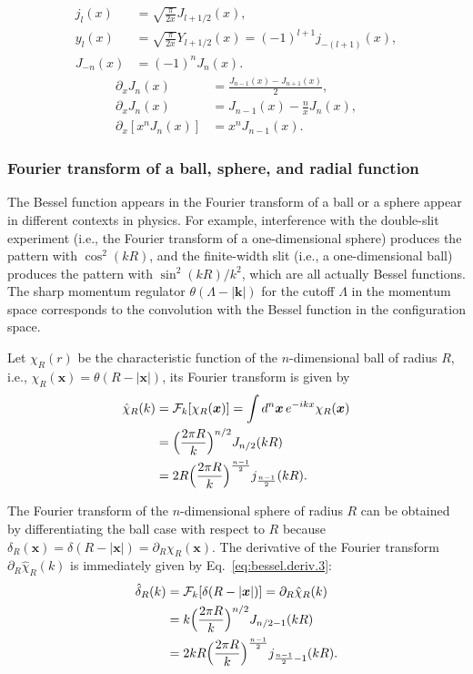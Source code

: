 \documentclass[amsmath,amssymb,prc,aps]{revtex4-2}
\begin{document}
\begin{align}
  j_l(x) &= \sqrt{\frac{\pi}{2x}} J_{l+1/2}(x), \\
  y_l(x)
  &= \sqrt{\frac{\pi}{2x}} Y_{l+1/2}(x)
  = (-1)^{l+1} j_{-(l+1)}(x), \\
  J_{-n}(x) &= (-1)^n J_n(x).
\end{align}
\begin{align}
  \partial_x J_n(x) &= \frac{J_{n-1}(x) - J_{n+1}(x)}2, \\
  \partial_x J_n(x) &= J_{n-1}(x) - \frac nx J_n(x), \\
  \partial_x [x^n J_n(x)] &= x^n J_{n-1}(x).
  \label{eq:bessel.deriv.3}
\end{align}

\subsubsection{Fourier transform of a ball, sphere, and radial function}

The Bessel function appears in the Fourier transform of a ball or a sphere
appear in different contexts in physics.  For example, interference with the
double-slit experiment (i.e., the Fourier transform of a one-dimensional
sphere) produces the pattern with $\cos^2(kR)$, and the finite-width slit
(i.e., a one-dimensional ball) produces the pattern with $\sin^2(kR)/k^2$,
which are all actually Bessel functions. The sharp momentum regulator
$\theta(\Lambda - |\bm{k}|)$ for the cutoff $\Lambda$ in the momentum space
corresponds to the convolution with the Bessel function in the configuration
space.

Let $\chi_R(r)$ be the characteristic function of the $n$-dimensional ball of
radius $R$, i.e., $\chi_R(\bm{x}) = \theta(R - |\bm{x}|)$, its Fourier
transform is given by
\begin{align}
  \hat\chi_R(k)
  &= \mathcal{F}_k[\chi_R(\bm{x})] = \int d^n\bm{x}\, e^{-ikx} \chi_R(\bm{x}) \notag \\
  &= \Bigl(\frac{2\pi R}{k}\Bigr)^{n/2} J_{n/2}(kR) \notag \\
  &= 2R \Bigl(\frac{2\pi R}{k}\Bigr)^{\frac{n-1}2} j_{\frac{n-1}2}(kR).
\end{align}

The Fourier transform of the $n$-dimensional sphere of radius $R$ can be
obtained by differentiating the ball case with respect to $R$ because
$\delta_R(\bm{x}) = \delta(R-|\bm{x}|) = \partial_R \chi_R(\bm{x})$.  The
derivative of the Fourier transform $\partial_R \hat\chi_R(k)$ is immediately
given by Eq.~\eqref{eq:bessel.deriv.3}:
\begin{align}
  \hat\delta_R(k) &= \mathcal{F}_k[\delta(R - |\bm{x}|)] = \partial_R \hat\chi_R(k) \notag \\
  &= k \Bigl(\frac{2\pi R}{k}\Bigr)^{n/2} J_{n/2-1}(kR) \notag \\
  &= 2kR \Bigl(\frac{2\pi R}{k}\Bigr)^{\frac{n-1}2} j_{\frac{n-1}2-1}(kR).
\end{align}
\end{document}
